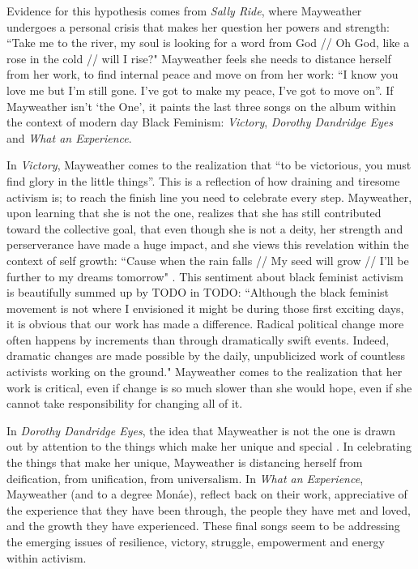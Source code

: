 \documentclass[a4paper, 11pt]{article} %
\begin{document}
Evidence for this hypothesis comes from \emph{Sally Ride}, where Mayweather undergoes a personal crisis that makes her question her powers and strength:
 ``Take me to the river, my soul is looking for a word from God // Oh God, like a rose in the cold // will I rise?" \cite{sallyride}
Mayweather feels she needs to distance herself from her work, to find internal peace and move on from her work:
 ``I know you love me but I'm still gone. I've got to make my peace, I've got to move on''\cite{sallyride}.
 If Mayweather isn't `the One', it paints the last three songs on the album within the context of modern day Black Feminism: \emph{Victory}, \emph{Dorothy Dandridge Eyes} and \emph{What an Experience}.
 
 In \emph{Victory}, Mayweather comes to the realization that ``to be victorious, you must find glory in the little things''\cite{victory}.
This is a reflection of how draining and tiresome activism is; to reach the finish line you need to celebrate every step.
Mayweather, upon learning that she is not the one, realizes that she has still contributed toward the collective goal, that even though she is not a deity, her strength and perserverance have made a huge impact, and she views this revelation within the context of self growth: 
 ``Cause when the rain falls // My seed will grow // I'll be further to my dreams tomorrow" \cite{victory}.
 This sentiment about black feminist activism is beautifully summed up by TODO in TODO:
 ``Although the black feminist movement is not where I envisioned it might be during those first exciting days, it is obvious that our work has made a difference. Radical political change more often happens by increments than through dramatically swift events. Indeed, dramatic changes are made possible by the daily, unpublicized work of countless activists working on the ground." \cite{smithhomegirls}
 Mayweather comes to the realization that her work is critical, even if change is so much slower than she would hope, even if she cannot take responsibility for changing all of it.
 
 In \emph{Dorothy Dandridge Eyes}, the idea that Mayweather is not the one is drawn out by attention to the things which make her unique and special \cite{dorothydandridgeeyes}.
 In celebrating the things that make her unique, Mayweather is distancing herself from deification, from unification, from universalism.
 In \emph{What an Experience}, Mayweather (and to a degree Mon\'ae), reflect back on their work, appreciative of the experience that they have been through, the people they have met and loved, and the growth they have experienced. 
 These final songs seem to be addressing the emerging issues of resilience, victory, struggle, empowerment and energy within activism.
\end{document}
